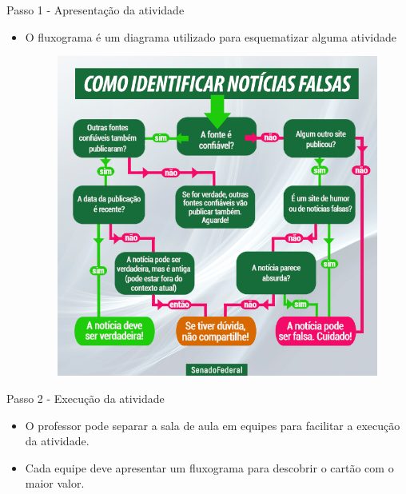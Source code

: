 \documentclass{beamer}
\begin{document}
\begin{frame}{Passo 1 - Apresentação da atividade}

\begin{itemize}
    \item O fluxograma é um diagrama utilizado para esquematizar alguma atividade
    
\begin{figure}
\begin{center}
	\includegraphics[scale=0.25]{images/fake news.png} 
\end{center}
\end{figure}

 
    

\end{itemize}



\end{frame}


\begin{frame}{Passo 2 - Execução da atividade}

\begin{itemize}

\item <1->O professor pode separar a sala de aula em equipes para facilitar a execução da atividade.

\item <2->Cada equipe deve apresentar um fluxograma para descobrir o cartão com o maior valor.


\end{itemize}


\end{frame}
\end{document}

